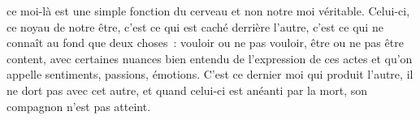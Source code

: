 {ce moi-là est une simple fonction du cerveau et non notre moi
véritable. Celui-ci, ce noyau de notre être, c'est ce qui est caché
derrière l'autre, c'est ce qui ne connaît au fond que deux choses~:
vouloir ou ne pas vouloir, être ou ne pas être content, avec
certaines nuances bien entendu de l'expression de ces actes et qu'on
appelle sentiments, passions, émotions. C'est ce dernier moi qui
produit l'autre, il ne dort pas avec cet autre, et quand celui-ci est
anéanti par la mort, son compagnon n'est pas atteint.
}



